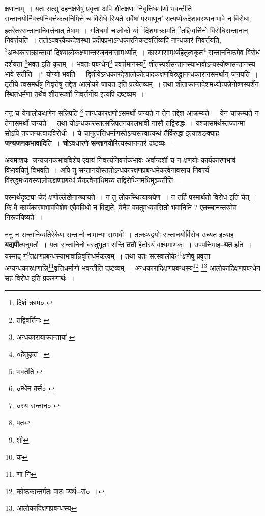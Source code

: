 \documentclass[article,12pt,a4paper]{memoir}
\begin{document}
	क्षणानाम् । यतः सत्सु दहनक्षणेषु प्रवृत्ता अपि शीतक्षणा निवृत्तिधर्माणो भवन्तीति सन्तानयोर्निवर्त्त्यनिवर्त्तकत्वनिमित्ते च विरोधे स्थिते सर्वेषां परमाणूनां सत्यप्येकदेशावस्थानाभावे न विरोधः, इतरेतरसन्तानानिवर्त्तनात् तेषाम् । गतिधर्मा चालोको यां \footnote{दिशं क्राम० \cite{dp-msC}}\-दिशमाक्रामति \footnote{तद्विवर्त्तिनः \cite{dp-msA}}\-तद्दिग्वर्त्तिनो विरोधिसन्तानान् निवर्त्तयति । ततोऽपवरकैकदेशस्था प्रदीपप्रभाऽन्धकारनिकटवर्त्तिव्यपि नान्धकारं निवर्त्तयति, \footnote{अन्धकारायाक्रान्तायां \cite{dp-msA}}\-अन्धकाराक्रान्तायां दिश्यालोकक्षणान्तरजननासामर्थ्यात् । कारणासामर्थ्यहेतुत्वकृतं\footnote{०हेतुकृतं--\cite{dp-msA} \cite{dp-edP} \cite{dp-edH} \cite{dp-edE} \cite{dp-edN}} सन्ताननिष्ठमेव विरोधं दर्शयता \footnote{भवतेति \cite{dp-edP} \cite{dp-edH}}\-भवत इति कृतम् । भवतः प्रबन्धेन\footnote{०न्धेन वर्त्त० \cite{dp-msA} \cite{dp-msB} \cite{dp-msD} \cite{dp-edP} \cite{dp-edH} \cite{dp-edE} \cite{dp-edN}} प्रवर्त्तमानस्य\footnote{०स्य सन्तान० \cite{dp-msC}} शीतस्पर्शसन्तानस्याभावोऽन्यस्योष्णसन्तानस्य भावे सतीति ।” योग्यो भवति । द्वितीयेऽन्धकारदेशालोकोत्पादकक्षणविरुद्धानन्धकारानसमर्थान् जनयति । तृतीये त्वसमर्थेषु निवृत्तेषु तद्देश आलोको जायत इति प्रत्येतव्यम् । तथा शीताक्रान्तदेशमध्योत्पन्नेनोष्णस्पर्शेन स्थितधर्मणा तथैव शीतस्पर्शो निवर्त्तनीय इत्यपि द्रष्टव्यम् ।
	\pend
      

	  \pstart ननु च येनालोकक्षणेन सन्निपति \footnote{पत} तान्धकारक्षणोऽसमर्थो जन्यते न तेन तद्देश आक्रम्यते । येन चाक्रम्यते न तेनासमर्थो जन्यते । तथा योऽन्धकारस्तत्सन्निपतनकालभावी नासौ तद्विरुद्धः । यश्चासमर्थस्तज्जन्मा सोऽपि तज्जन्यत्वादविरोधी । ये चानुत्पत्तिधर्माणस्तेऽप्यसत्त्वात्कथं तैर्विरुद्धा इत्याशङ्क्याह--\textbf{जन्यजनकभावादि}ति । \textbf{चो}ऽवधारणे \textbf{सन्तानयो}रित्यस्यानन्तरं द्रष्टव्यः ।
	\pend
      

	  \pstart अयमाशयः--जन्यजनकभावविशेष एवायं निवर्त्त्यनिवर्त्तकभावः अर्वाग्दर्शी च न क्षणयोः कार्यकारणभावं विभावयितुं विभवति । अपि तु सन्तानयोस्ततोऽन्धकारक्षणप्रबन्धमेकत्वेनावसाय निवर्त्त्यं विरुद्धमध्यवस्यालोकक्षणप्रबन्धं चैकत्वेनाधिमच्य तद्विरोधिनमधिमुञ्चतीति ।
	\pend
      

	  \pstart परमार्थदृष्ट्या चेदं क्षणोल्लेखेनाख्यायते । न तु लोकस्थित्याश्रयेण । न तर्हि परमार्थतो विरोध इति चेत् । किं वै कार्यकारणभावविशेष एवैवंविधो न विद्यते, येनैवं वक्तुमध्यवसितो भवानिति ? एतच्चानन्तरमेव निरूपयिष्यते ।
	\pend
      

	  \pstart ननु न सन्तानिव्यतिरेकेण सन्तानो नामान्यः सम्भवी । तत्कथं\leavevmode{}द्वयोः सन्तानयोर्विरोध उच्यत इत्याह \textbf{यद्यपी}त्यनुमतौ । यतः सन्तानिनो वस्तुभूताः सन्ति \textbf{ततो} हेतोरयं वक्ष्यमाणकः । उपपत्तिमाह--\textbf{यत} इति । यस्माद् ग\footnote{शी}\-तक्षणप्रबन्धस्याभावान्निवृत्तिधर्मकत्वम् । तथा यतः सत्स्वालोके\footnote{क}\-क्षणेषु प्रवृत्ता अप्यन्धकारक्षणान्नि\footnote{णा नि}\-वृत्तिधर्माणो भवन्तीति द्रष्टव्यम् । अन्धकारादिक्षणप्रबन्धस्य\footnote{कोष्ठकान्तर्गतः पाठः व्यर्थः--सं० ।} \footnote{आलोकादिक्षणप्रबन्धस्य} आलोकादिक्षणप्रबन्धेन सह विरोध इति प्रकरणार्थः ।
	\pend
	  \bigskip
	  \begingroup
	
\end{document}
